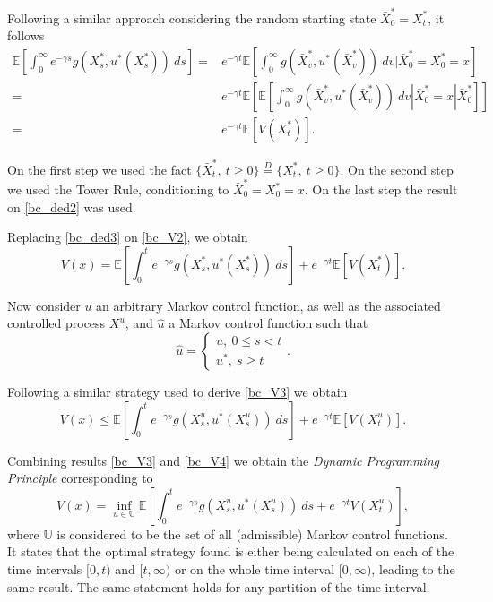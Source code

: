 Following a similar approach considering the random starting state $\bar{X}^*_0=X^*_t$, it follows
\begin{align}
\mathds{E}\left[ \int^\infty_0 e^{-\gamma s}g(X^*_s,u^*(X^*_s)) \ ds  \right]
=& e^{-\gamma t} \mathds{E}\left[ \int^\infty_0 g(\bar{X}^*_{v},u^*(\bar{X}^*_{v})) \ dv | \bar{X}^*_0=X^*_0=x \right] \nonumber \\
=& e^{-\gamma t}  \mathds{E}\left[ \mathds{E}\left[ \int^\infty_0 g(\bar{X}^*_{v},u^*(\bar{X}^*_{v})) \ dv | \bar{X}^*_0=x | \bar{X}^*_0  \right] \right] \nonumber \\
=& e^{-\gamma t}  \mathds{E}\left[ V(X_t^*)  \right]. \label{bc_ded3}
\end{align}

On the first step we used the fact $\{ \bar{X}_t^*, \ t\geq 0\}\overset{D}{=} \{ X_t^*, \ t\geq 0\}$. On the second step we used the Tower Rule, conditioning to $\bar{X}^*_0=X^*_0=x$. On the last step the result on \eqref{bc_ded2} was used.

Replacing \eqref{bc_ded3} on \eqref{bc_V2}, we obtain
\begin{equation}
 V(x)= \mathds{E}\left[ \int^t_0 e^{-\gamma s} g(X^*_s,u^*(X^*_s)) \ ds\right] + e^{-\gamma t}  \mathds{E}\left[ V(X_t^*)  \right].
 \label{bc_V3}
\end{equation}

Now consider $u$ an arbitrary Markov control function, as well as the associated controlled process $X^u$, and $\hat{u}$ a Markov control function such that
$$\hat{u}=\begin{cases}
u, \ 0\leq s <t \\
u^*, \ s \geq t
\end{cases}.$$

Following a similar strategy used to derive \eqref{bc_V3} we obtain
\begin{equation}
V(x) \leq \mathds{E}\left[ \int^t_0 e^{-\gamma s} g(X^u_s,u^*(X^u_s)) \ ds\right] + e^{-\gamma t}  \mathds{E}\left[ V(X_t^u)  \right].
\label{bc_V4}
\end{equation}

Combining results \eqref{bc_V3} and \eqref{bc_V4} we obtain the \textit{Dynamic Programming Principle} corresponding to 
\begin{equation}
V(x)=\inf_{u \in \mathds{U}} \mathds{E}\left[ \int^t_0 e^{-\gamma s} g(X^u_s,u^*(X^u_s)) \ ds+ e^{-\gamma t} V(X_t^u)  \right],
\label{bc_V5}
\end{equation}
where $\mathds{U}$ is considered to be the set of all (admissible) Markov control functions. It states that the optimal strategy found is either being calculated on each of the time intervals $[0,t)$ and $[t,\infty)$ or on the whole time interval $[0,\infty)$, leading to the same result. The same statement holds for any partition of the time interval.



